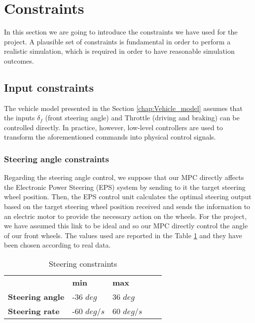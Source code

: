 \section{Constraints}
In this section we are going to introduce the constraints we have used for the project. A plausible set of constraints is fundamental in order to perform a realistic simulation, which is required in order to have reasonable simulation outcomes. 
\subsection{Input constraints}

The vehicle model presented in the Section \ref{chap:Vehicle_model} assumes that the inputs $\delta_f$ (front steering angle) and Throttle (driving and braking) can be controlled
directly. In practice, however, low-level controllers are used to transform the aforementioned
commands into physical control signals.
\subsubsection{Steering angle constraints}
Regarding the steering angle control, we suppose that our MPC directly affects the Electronic Power Steering (EPS) system by sending to it the target steering wheel position. Then, the EPS control unit calculates the optimal steering output based on the target steering wheel position received and sends the information to an electric motor to provide the necessary action on the wheels.
For the project, we have assumed this link to be ideal and so our MPC directly control the angle of our front wheels. The values used are reported in the Table \ref{tab:steering} and they have been chosen according to real data\cite{forkenbrock2005assessment}.

\begin{table}[H]
\begin{center}
\begin{tabular}{lllll}
\cline{2-3}
\multicolumn{1}{l|}{}                         & \multicolumn{1}{l|}{\textbf{min}} & \multicolumn{1}{l|}{\textbf{max}} &  &  \\ \cline{1-3}
\multicolumn{1}{|l|}{\textbf{Steering angle}} & \multicolumn{1}{l|}{-36 $deg$}      & \multicolumn{1}{l|}{36 $deg$}      &  &  \\ \cline{1-3}
\multicolumn{1}{|l|}{\textbf{Steering rate}}  & \multicolumn{1}{l|}{-60 $deg/s$}    & \multicolumn{1}{l|}{60 $deg/s$}    &  &  \\ \cline{1-3}
\end{tabular}
\caption{Steering constraints}
\label{tab:steering}

\end{center}
\end{table}

